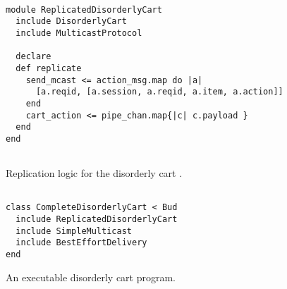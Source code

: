 \begin{figure}[h]
\begin{scriptsize}
\begin{lstlisting}

module ReplicatedDisorderlyCart
  include DisorderlyCart
  include MulticastProtocol

  declare
  def replicate
    send_mcast <= action_msg.map do |a| 
      [a.reqid, [a.session, a.reqid, a.item, a.action]] 
    end
    cart_action <= pipe_chan.map{|c| c.payload }
  end
end


\end{lstlisting}
\centering
\vspace{-10pt}
\caption{Replication logic for the disorderly cart .}
\label{fig:multicast-impl}
\end{scriptsize}
\vspace{-2pt}
\end{figure}


\begin{figure}[h]
\begin{scriptsize}
\begin{lstlisting}

class CompleteDisorderlyCart < Bud
  include ReplicatedDisorderlyCart
  include SimpleMulticast
  include BestEffortDelivery
end

\end{lstlisting}
\centering
\vspace{-10pt}
\caption{An executable disorderly cart program.}
\label{fig:multicast-impl}
\end{scriptsize}
\vspace{-2pt}
\end{figure}